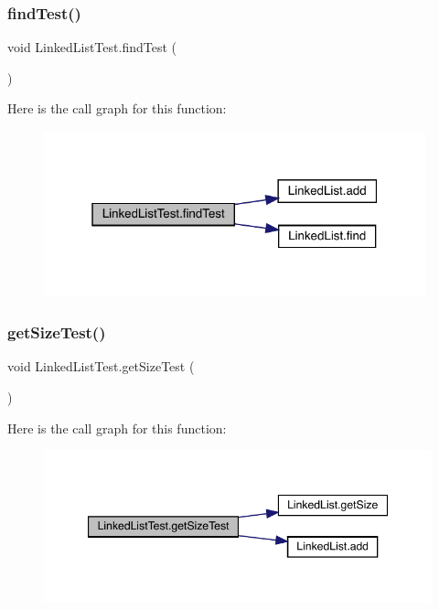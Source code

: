 \subsubsection{\texorpdfstring{find\+Test()}{findTest()}}
{\footnotesize\ttfamily void Linked\+List\+Test.\+find\+Test (\begin{DoxyParamCaption}{ }\end{DoxyParamCaption})\hspace{0.3cm}{\ttfamily [inline]}}

Here is the call graph for this function\+:
\nopagebreak
\begin{figure}[H]
\begin{center}
\leavevmode
\includegraphics[width=313pt]{class_linked_list_test_a7ec3ac010e6a30800f558fd8ba3963c1_cgraph}
\end{center}
\end{figure}
\mbox{\label{class_linked_list_test_aa351eea543f28f3246130b6d11495032}} 
\subsubsection{\texorpdfstring{get\+Size\+Test()}{getSizeTest()}}
{\footnotesize\ttfamily void Linked\+List\+Test.\+get\+Size\+Test (\begin{DoxyParamCaption}{ }\end{DoxyParamCaption})\hspace{0.3cm}{\ttfamily [inline]}}

Here is the call graph for this function\+:
\nopagebreak
\begin{figure}[H]
\begin{center}
\leavevmode
\includegraphics[width=347pt]{class_linked_list_test_aa351eea543f28f3246130b6d11495032_cgraph}
\end{center}
\end{figure}
\mbox{\label{class_linked_list_test_a8f9041662d2c4a40641ae02627ea3bcd}} 
